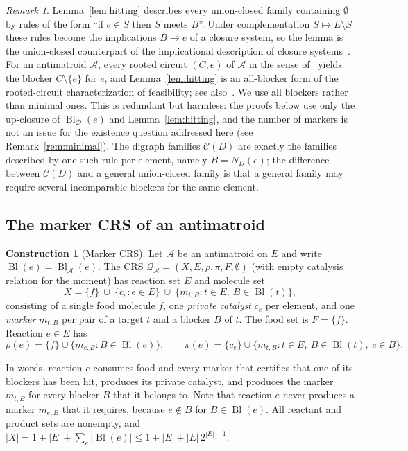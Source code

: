 \documentclass[11pt,a4paper]{article}
\theoremstyle{plain}
\theoremstyle{definition}
\newtheorem{construction}[theorem]{Construction}
\theoremstyle{remark}
\newtheorem{remark}[theorem]{Remark}
\newcommand{\Bl}{\operatorname{Bl}}
\newcommand{\cA}{\mathcal{A}}
\newcommand{\cC}{\mathcal{C}}
\newcommand{\cD}{\mathcal{D}}
\newcommand{\cQ}{\mathcal{Q}}
\newcommand{\Nin}{N^{-}}
\begin{document}
\begin{remark}\label{rem:horn}
Lemma~\ref{lem:hitting} describes every union-closed family containing $\emptyset$ by rules of the form ``if $e\in S$ then $S$ meets $B$''. Under complementation $S\mapsto E\setminus S$ these rules become the implications $B\to e$ of a closure system, so the lemma is the union-closed counterpart of the implicational description of closure systems~\cite{wild2017joy}. For an antimatroid $\cA$, every rooted circuit $(C,e)$ of $\cA$ in the sense of~\cite{korte1991greedoids,dietrich1987circuit} yields the blocker $C\setminus\{e\}$ for $e$, and Lemma~\ref{lem:hitting} is an all-blocker form of the rooted-circuit characterization of feasibility; see also~\cite{yoshikawa2017representation}. We use all blockers rather than minimal ones. This is redundant but harmless: the proofs below use only the up-closure of $\Bl_{\cD}(e)$ and Lemma~\ref{lem:hitting}, and the number of markers is not an issue for the existence question addressed here (see Remark~\ref{rem:minimal}). The digraph families $\cC(D)$ are exactly the families described by one such rule per element, namely $B=\Nin_D(e)$; the difference between $\cC(D)$ and a general union-closed family is that a general family may require several incomparable blockers for the same element.
\end{remark}

\subsection{The marker CRS of an antimatroid}

\begin{construction}[Marker CRS]\label{con:marker}
Let $\cA$ be an antimatroid on $E$ and write $\Bl(e)=\Bl_{\cA}(e)$. The CRS $\cQ_{\cA}=(X,E,\rho,\pi,F,\emptyset)$ (with empty catalysis relation for the moment) has reaction set $E$ and molecule set
\[
X=\{f\}\ \cup\ \{c_e: e\in E\}\ \cup\ \{m_{t,B}: t\in E,\ B\in\Bl(t)\},
\]
consisting of a single food molecule $f$, one \emph{private catalyst} $c_e$ per element, and one \emph{marker} $m_{t,B}$ per pair of a target $t$ and a blocker $B$ of $t$. The food set is $F=\{f\}$. Reaction $e\in E$ has
\[
\rho(e)=\{f\}\cup\{m_{e,B}: B\in\Bl(e)\},\qquad
\pi(e)=\{c_e\}\cup\{m_{t,B}: t\in E,\ B\in\Bl(t),\ e\in B\}.
\]
\end{construction}

In words, reaction $e$ consumes food and every marker that certifies that one of its blockers has been hit, produces its private catalyst, and produces the marker $m_{t,B}$ for every blocker $B$ that it belongs to. Note that reaction $e$ never produces a marker $m_{e,B}$ that it requires, because $e\notin B$ for $B\in\Bl(e)$. All reactant and product sets are nonempty, and $|X|=1+|E|+\sum_{e}|\Bl(e)|\le 1+|E|+|E|\,2^{|E|-1}$.
\end{document}
